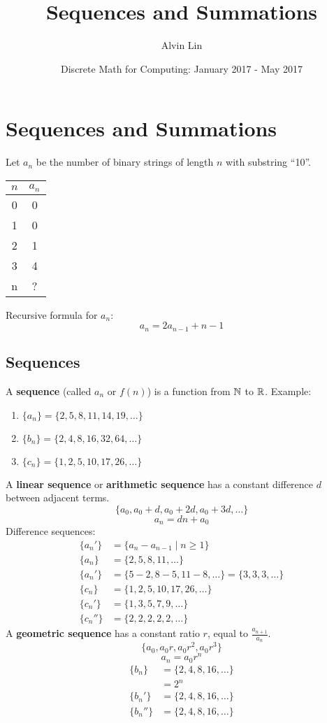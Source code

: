\documentclass[letterpaper, 12pt]{math}
\title{Sequences and Summations}
\author{Alvin Lin}
\date{Discrete Math for Computing: January 2017 - May 2017}
\begin{document}
\maketitle

\section*{Sequences and Summations}
Let \( a_{n} \) be the number of binary strings of length \( n \) with substring
``10''.
\begin{center}
  \begin{tabular}{|c|c|}
    \hline
    \( n \) & \( a_{n} \) \\
    \hline
    0 & 0 \\
    \hline
    1 & 0 \\
    \hline
    2 & 1 \\
    \hline
    3 & 4 \\
    \hline
    n & ? \\
    \hline
  \end{tabular}
\end{center}
Recursive formula for \( a_{n} \):
\[ a_{n} = 2a_{n-1}+n-1 \]

\subsection*{Sequences}
A \textbf{sequence} (called \( a_{n} \) or \( f(n) \)) is a function from
\( \mathbb{N} \) to \( \mathbb{R} \). Example:
\begin{enumerate}
  \item \( \{a_{n}\} = \{2,5,8,11,14,19,\dots\} \)
  \item \( \{b_{n}\} = \{2,4,8,16,32,64,\dots\} \)
  \item \( \{c_{n}\} = \{1,2,5,10,17,26,\dots\} \)
\end{enumerate}
A \textbf{linear sequence} or \textbf{arithmetic sequence} has a constant
difference \( d \) between adjacent terms.
\[ \{a_{0},a_{0}+d,a_{0}+2d,a_{0}+3d,\dots\} \]
\[ a_{n} = dn+a_{0} \]
Difference sequences:
\begin{align*}
  \{a_{n}'\} &= \{a_{n}-a_{n-1}\mid n \geq 1\} \\
  \{a_{n}\} &= \{2,5,8,11,\dots\} \\
  \{a_{n}'\} &= \{5-2,8-5,11-8,\dots\} = \{3,3,3,\dots\} \\
  \{c_{n}\} &= \{1,2,5,10,17,26,\dots\} \\
  \{c_{n}'\} &= \{1,3,5,7,9,\dots\} \\
  \{c_{n}''\} &= \{2,2,2,2,2,\dots\}
\end{align*}
A \textbf{geometric sequence} has a constant ratio \( r \), equal to
\( \frac{a_{n+1}}{a_{n}} \).
\[ \{a_{0},a_{0}r,a_{0}r^{2},a_{0}r^{3}\} \]
\[ a_{n} = a_{0}r^{n} \]
\begin{align*}
  \{b_{n}\} &= \{2,4,8,16,\dots\} \\
  &= 2^{n} \\
  \{b_{n}'\} &= \{2,4,8,16,\dots\} \\
  \{b_{n}''\} &= \{2,4,8,16,\dots\}
\end{align*}
\end{document}
